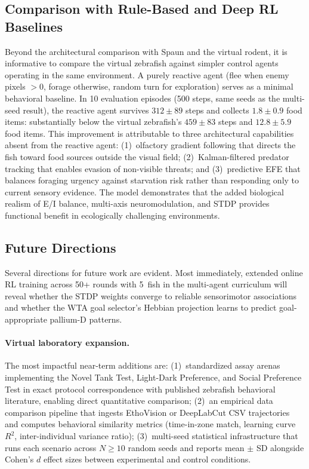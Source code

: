 \documentclass[12pt]{article}
\begin{document}
\subsection{Comparison with Rule-Based and Deep RL Baselines}

Beyond the architectural comparison with Spaun and the virtual rodent,
it is informative to compare the virtual zebrafish against simpler
control agents operating in the same environment.
A purely reactive agent (flee when enemy pixels $>$0, forage
otherwise, random turn for exploration) serves as a minimal behavioral
baseline.
In 10 evaluation episodes (500 steps, same seeds as the multi-seed
result), the reactive agent survives $312 \pm 89$ steps and collects
$1.8 \pm 0.9$ food items: substantially below the virtual zebrafish's
$459 \pm 83$ steps and $12.8 \pm 5.9$ food items.
This improvement is attributable to three architectural capabilities
absent from the reactive agent: (1)~olfactory gradient following that
directs the fish toward food sources outside the visual field;
(2)~Kalman-filtered predator tracking that enables evasion of
non-visible threats; and (3)~predictive EFE that balances foraging
urgency against starvation risk rather than responding only to
current sensory evidence.
The model demonstrates that the added biological realism of E/I
balance, multi-axis neuromodulation, and STDP provides functional
benefit in ecologically challenging environments.

\subsection{Future Directions}

Several directions for future work are evident.
Most immediately, extended online RL training across 50+ rounds with
5~fish in the multi-agent curriculum will reveal whether the STDP
weights converge to reliable sensorimotor associations and whether
the WTA goal selector's Hebbian projection learns to predict
goal-appropriate pallium-D patterns.

\paragraph{Virtual laboratory expansion.}
The most impactful near-term additions are:
(1)~standardized assay arenas implementing the Novel Tank Test,
Light-Dark Preference, and Social Preference Test in exact protocol
correspondence with published zebrafish behavioral literature, enabling
direct quantitative comparison;
(2)~an empirical data comparison pipeline that ingests EthoVision or
DeepLabCut CSV trajectories and computes behavioral similarity metrics
(time-in-zone match, learning curve $R^2$, inter-individual variance ratio);
(3)~multi-seed statistical infrastructure that runs each scenario across
$N \ge 10$ random seeds and reports mean $\pm$ SD alongside Cohen's $d$
effect sizes between experimental and control conditions.
\end{document}
